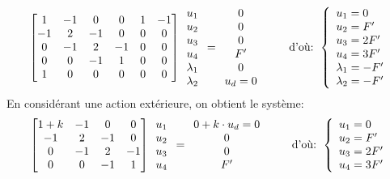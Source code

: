 \begin{equation}
\begin{bmatrix} 1 & -1 & 0 & 0 & 1&-1 \\ -1 & 2 & -1 & 0 & 0&0 \\ 0 & -1 & 2 & -1 & 0&0\\ 0&0&-1&1& 0&0 \\ 1&0&0&0&0&0
\end{bmatrix}
\mathbf{\begin{array}{c} u_1\\u_2\\u_3\\u_4\\ \lambda_1 \\ \lambda_2 \end{array}}
=
\mathbf{\begin{array}{c} 0\\0\\0\\F' \\ 0 \\ u_d=0\end{array}}
\qquad \text{ d'où: } 
\left\{\begin{array}{l} u_1=0 \\ u_2=F' \\ u_3=2F' \\ u_4=3F' \\ \lambda_1 = -F' \\ \lambda_2 = -F' \end{array}\right.
\end{equation}
\medskipvm
En considérant une action extérieure, on obtient le système:
\begin{equation}
\begin{bmatrix} 1+k & -1 & 0 & 0 \\ -1 & 2 & -1 & 0 \\ 0 & -1 & 2 & -1\\ 0&0&-1&1
\end{bmatrix}
\mathbf{\begin{array}{c} u_1\\u_2\\u_3\\u_4 \end{array}}
=
\mathbf{\begin{array}{c} 0+k\cdot u_d = 0\\0\\0\\F' \end{array}}
\qquad \text{ d'où: } 
\left\{\begin{array}{l} u_1=0 \\ u_2=F' \\ u_3=2F' \\ u_4=3F' \end{array}\right.
\end{equation}


